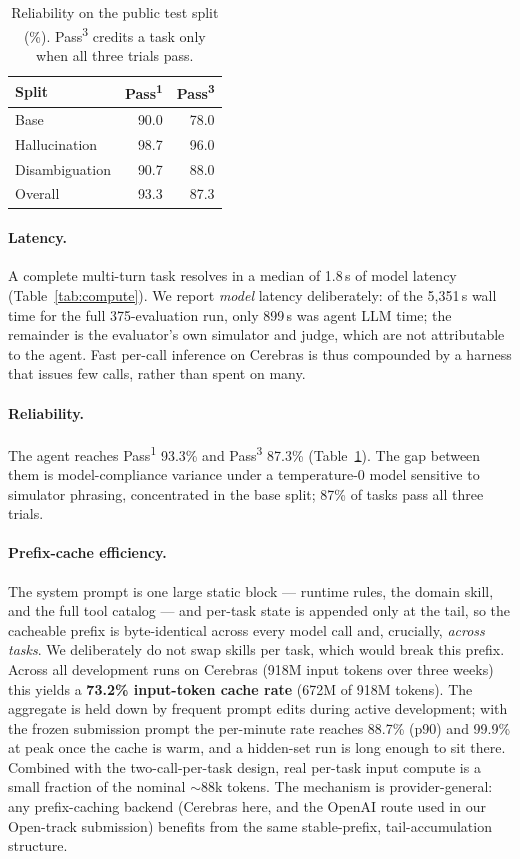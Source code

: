 \documentclass{article}
\begin{document}
\begin{table}[t]
\centering
\begin{tabular}{lrr}
\toprule
Split & Pass\textsuperscript{1} & Pass\textsuperscript{3} \\
\midrule
Base            & 90.0 & 78.0 \\
Hallucination   & 98.7 & 96.0 \\
Disambiguation  & 90.7 & 88.0 \\
\midrule
Overall         & 93.3 & 87.3 \\
\bottomrule
\end{tabular}
\caption{Reliability on the public test split (\%). Pass\textsuperscript{3}
credits a task only when all three trials pass.}
\label{tab:reliability}
\end{table}

\paragraph{Latency.}
A complete multi-turn task resolves in a median of 1.8\,s of model latency
(Table~\ref{tab:compute}). We report \emph{model} latency deliberately: of the
5{,}351\,s wall time for the full 375-evaluation run, only 899\,s was
agent LLM time; the remainder is the evaluator's own simulator and judge, which
are not attributable to the agent. Fast per-call inference on Cerebras is thus
compounded by a harness that issues few calls, rather than spent on many.

\paragraph{Reliability.}
The agent reaches Pass\textsuperscript{1} 93.3\% and Pass\textsuperscript{3}
87.3\% (Table~\ref{tab:reliability}). The gap between them is
model-compliance variance under a temperature-0 model sensitive to simulator
phrasing, concentrated in the base split; 87\% of tasks pass all three trials.

\paragraph{Prefix-cache efficiency.}
The system prompt is one large static block --- runtime rules, the domain skill,
and the full tool catalog --- and per-task state is appended only at the tail, so
the cacheable prefix is byte-identical across every model call and, crucially,
\emph{across tasks}. We deliberately do not swap skills per task, which would
break this prefix. Across all development runs on Cerebras (918M input tokens
over three weeks) this yields a \textbf{73.2\% input-token cache rate} (672M of
918M tokens). The aggregate is held down by frequent prompt edits during active
development; with the frozen submission prompt the per-minute rate reaches
88.7\% (p90) and 99.9\% at peak once the cache is warm, and a hidden-set run is
long enough to sit there. Combined with the two-call-per-task design, real
per-task input compute is a small fraction of the nominal $\sim$88k tokens. The
mechanism is provider-general: any prefix-caching backend (Cerebras here, and
the OpenAI route used in our Open-track submission) benefits from the same
stable-prefix, tail-accumulation structure.
\end{document}
